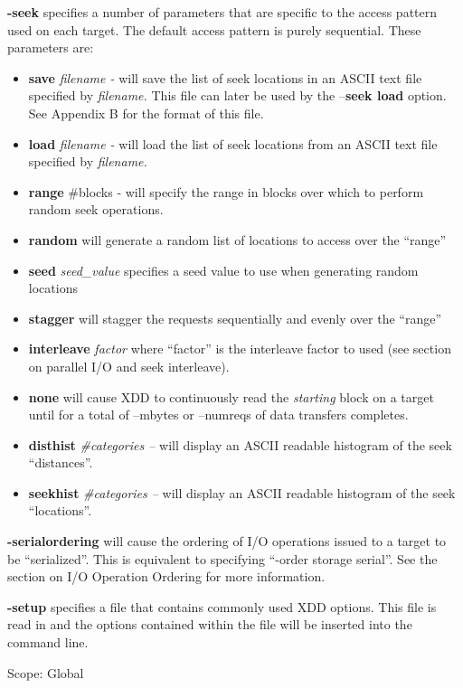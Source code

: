 \textbf{-seek} specifies a number of parameters that are specific to the access pattern used on each target. The default access pattern is purely sequential. These parameters are:

\begin{itemize}
\item
  \textbf{save} \emph{filename -} will save the list of seek locations in an ASCII text file specified by \emph{filename.} This file can later be used by the --\textbf{seek load} option. See Appendix B for the format of this file.
\item
  \textbf{load} \emph{filename -} will load the list of seek locations from an ASCII text file specified by \emph{filename.}
\item
  \textbf{range} \#blocks - will specify the range in blocks over which to perform random seek operations.
\item
  \textbf{random} will generate a random list of locations to access over the ``range''
\item
  \textbf{seed} \emph{seed\_value} specifies a seed value to use when generating random locations
\item
  \textbf{stagger} will stagger the requests sequentially and evenly over the ``range''
\item
  \textbf{interleave} \emph{factor} where ``factor'' is the interleave factor to used (see section on parallel I/O and seek interleave).
\item
  \textbf{none} will cause XDD to continuously read the \emph{starting} block on a target until for a total of --mbytes or --numreqs of data transfers completes.
\item
  \textbf{disthist} \emph{\#categories --} will display an ASCII readable histogram of the seek ``distances''.
\item
  \textbf{seekhist} \emph{\#categories --} will display an ASCII readable histogram of the seek ``locations''.
\end{itemize}

\textbf{-serialordering} will cause the ordering of I/O operations issued to a target to be ``serialized''. This is equivalent to specifying ``-order storage serial''. See the section on I/O Operation Ordering for more information.

\textbf{-setup} specifies a file that contains commonly used XDD options. This file is read in and the options contained within the file will be inserted into the command line.

Scope: Global

